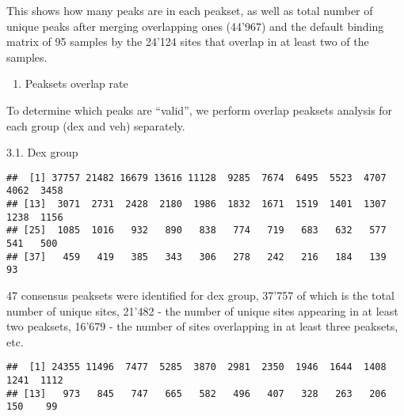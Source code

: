 \documentclass[
]{article}
\newenvironment{Shaded}{\begin{snugshade}}{\end{snugshade}}
\newcommand{\DataTypeTok}[1]{\textcolor[rgb]{0.13,0.29,0.53}{#1}}
\newcommand{\KeywordTok}[1]{\textcolor[rgb]{0.13,0.29,0.53}{\textbf{#1}}}
\newcommand{\NormalTok}[1]{#1}
\newcommand{\OperatorTok}[1]{\textcolor[rgb]{0.81,0.36,0.00}{\textbf{#1}}}
\newcommand{\StringTok}[1]{\textcolor[rgb]{0.31,0.60,0.02}{#1}}
\providecommand{\tightlist}{%
  \setlength{\itemsep}{0pt}\setlength{\parskip}{0pt}}
\begin{document}
This shows how many peaks are in each peakset, as well as total number
of unique peaks after merging overlapping ones (44'967) and the default
binding matrix of 95 samples by the 24'124 sites that overlap in at
least two of the samples.

\begin{enumerate}
\def\labelenumi{\arabic{enumi}.}
\setcounter{enumi}{2}
\tightlist
\item
  Peaksets overlap rate
\end{enumerate}

To determine which peaks are ``valid'', we perform overlap peaksets
analysis for each group (dex and veh) separately.

3.1. Dex group

\begin{Shaded}
\end{Shaded}

\begin{verbatim}
##  [1] 37757 21482 16679 13616 11128  9285  7674  6495  5523  4707  4062  3458
## [13]  3071  2731  2428  2180  1986  1832  1671  1519  1401  1307  1238  1156
## [25]  1085  1016   932   890   838   774   719   683   632   577   541   500
## [37]   459   419   385   343   306   278   242   216   184   139    93
\end{verbatim}

47 consensus peaksets were identified for dex group, 37'757 of which is
the total number of unique sites, 21'482 - the number of unique sites
appearing in at least two peaksets, 16'679 - the number of sites
overlapping in at least three peaksets, etc.

\begin{Shaded}
\end{Shaded}

\begin{verbatim}
##  [1] 24355 11496  7477  5285  3870  2981  2350  1946  1644  1408  1241  1112
## [13]   973   845   747   665   582   496   407   328   263   206   150    99
\end{verbatim}
\end{document}
